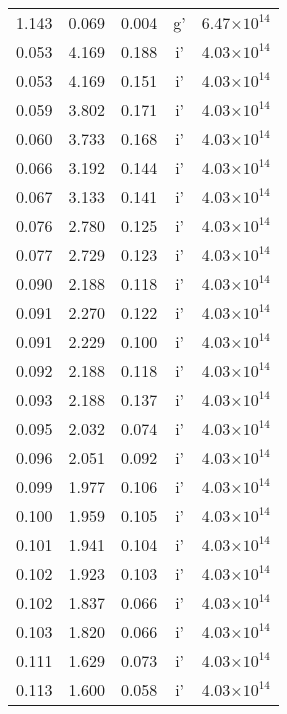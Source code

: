 \documentclass{aa}
\begin{document}
{\begin{longtable}{c|c|c|c|c}
  1.143 &   0.069 &  0.004 & g'        &  6.47$\times 10^{14}$    \\
  0.053 &   4.169 &  0.188 & i'        &  4.03$\times 10^{14}$    \\
  0.053 &   4.169 &  0.151 & i'        &  4.03$\times 10^{14}$    \\
  0.059 &   3.802 &  0.171 & i'        &  4.03$\times 10^{14}$    \\
  0.060 &   3.733 &  0.168 & i'        &  4.03$\times 10^{14}$    \\
  0.066 &   3.192 &  0.144 & i'        &  4.03$\times 10^{14}$    \\
  0.067 &   3.133 &  0.141 & i'        &  4.03$\times 10^{14}$    \\
  0.076 &   2.780 &  0.125 & i'        &  4.03$\times 10^{14}$    \\
  0.077 &   2.729 &  0.123 & i'        &  4.03$\times 10^{14}$    \\
  0.090 &   2.188 &  0.118 & i'        &  4.03$\times 10^{14}$    \\
  0.091 &   2.270 &  0.122 & i'        &  4.03$\times 10^{14}$    \\
  0.091 &   2.229 &  0.100 & i'        &  4.03$\times 10^{14}$    \\
  0.092 &   2.188 &  0.118 & i'        &  4.03$\times 10^{14}$    \\
  0.093 &   2.188 &  0.137 & i'        &  4.03$\times 10^{14}$    \\
  0.095 &   2.032 &  0.074 & i'        &  4.03$\times 10^{14}$    \\
  0.096 &   2.051 &  0.092 & i'        &  4.03$\times 10^{14}$    \\
  0.099 &   1.977 &  0.106 & i'        &  4.03$\times 10^{14}$    \\
  0.100 &   1.959 &  0.105 & i'        &  4.03$\times 10^{14}$    \\
  0.101 &   1.941 &  0.104 & i'        &  4.03$\times 10^{14}$    \\
  0.102 &   1.923 &  0.103 & i'        &  4.03$\times 10^{14}$    \\
  0.102 &   1.837 &  0.066 & i'        &  4.03$\times 10^{14}$    \\
  0.103 &   1.820 &  0.066 & i'        &  4.03$\times 10^{14}$    \\
  0.111 &   1.629 &  0.073 & i'        &  4.03$\times 10^{14}$    \\
  0.113 &   1.600 &  0.058 & i'        &  4.03$\times 10^{14}$    \\

\end{longtable}}
\end{document}
